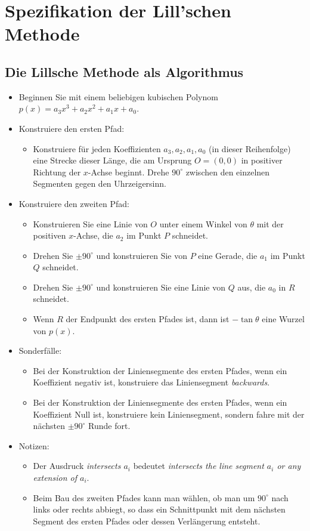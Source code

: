 
\section{Spezifikation der Lill'schen Methode}\label{s.method}

\subsection{Die Lillsche Methode als Algorithmus}

\begin{itemize}
\item Beginnen Sie mit einem beliebigen kubischen Polynom $p(x)=a_3x^3+a_2x^2+a_1x+a_0$.
\item Konstruiere den ersten Pfad:
\begin{itemize}
\item Konstruiere für jeden Koeffizienten $a_3,a_2,a_1,a_0$ (in dieser Reihenfolge) eine Strecke dieser Länge, die am Ursprung $O=(0,0)$ in positiver Richtung der $x$-Achse beginnt. Drehe $90^\circ$ zwischen den einzelnen Segmenten gegen den Uhrzeigersinn.
\end{itemize}
\item Konstruiere den zweiten Pfad:
\begin{itemize}
\item Konstruieren Sie eine Linie von $O$ unter einem Winkel von $\theta$ mit der positiven $x$-Achse, die $a_2$ im Punkt $P$ schneidet.
\item Drehen Sie $\pm 90^\circ$ und konstruieren Sie von $P$ eine Gerade, die $a_1$ im Punkt $Q$ schneidet.
\item Drehen Sie $\pm 90^\circ$ und konstruieren Sie eine Linie von $Q$ aus, die $a_0$ in $R$ schneidet.
\item Wenn $R$ der Endpunkt des ersten Pfades ist, dann ist $-\tan\theta$ eine Wurzel von $p(x)$.
\end{itemize}
\item Sonderfälle:
\begin{itemize}
\item Bei der Konstruktion der Liniensegmente des ersten Pfades, wenn ein Koeffizient negativ ist, konstruiere das Liniensegment \emph{backwards}.
\item Bei der Konstruktion der Liniensegmente des ersten Pfades, wenn ein Koeffizient Null ist, konstruiere kein Liniensegment, sondern fahre mit der nächsten $\pm 90^\circ$ Runde fort.
\end{itemize}
\item Notizen:
\begin{itemize}
\item Der Ausdruck \emph{intersects $a_i$} bedeutet \emph{intersects the line segment $a_i$ or any extension of $a_i$}.
\item Beim Bau des zweiten Pfades kann man wählen, ob man um $90^\circ$ nach links oder rechts abbiegt, so dass ein Schnittpunkt mit dem nächsten Segment des ersten Pfades oder dessen Verlängerung entsteht.
\end{itemize}
\end{itemize}

